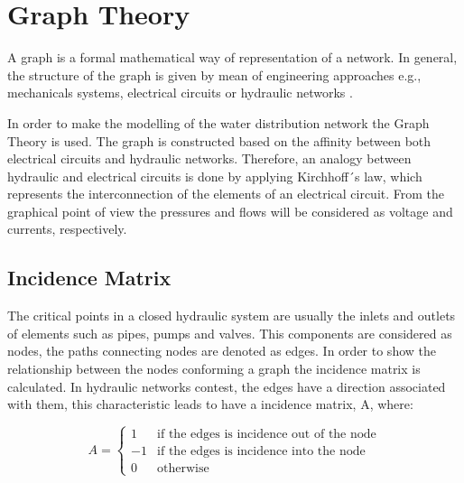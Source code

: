\section{Graph Theory}  
\label{GraphTheory}
A graph is a formal mathematical way of representation of a network. In general, the structure of the graph is given by mean of engineering approaches e.g., 
mechanicals systems, electrical circuits or hydraulic networks \cite{graph_intro}. 

In order to make the modelling of the water distribution network the Graph Theory is used. The graph is constructed based on the affinity between both
electrical circuits and hydraulic networks. Therefore, an analogy between hydraulic and electrical circuits is done by applying Kirchhoff´s law, 
which represents the interconnection of the elements of an electrical circuit.  
From the graphical point of view the pressures and flows will be considered as 
voltage and currents, respectively. 

\subsection{Incidence Matrix} 

The critical points in a closed hydraulic system are usually the inlets and outlets of elements such as pipes, pumps and valves. 
This components are considered as nodes, the paths connecting nodes are denoted as edges. 
In order to show the relationship between the nodes conforming a graph the 
incidence matrix is calculated. In hydraulic networks contest, the edges have a 
direction associated with them, this characteristic leads to have a incidence matrix, A, where:

\begin{equation}
\label{DiGraph}
 A =
		\left\{
		\begin{array}{ll}
		
		1 			&      \text{if the edges is incidence out of the node}	
\\
		-1                       &     \text{if the edges is incidence into the node}
\\

                0                       &      \text{otherwise}

		\end{array}
		\right.
\end{equation}	


 
%
%


 
 
 